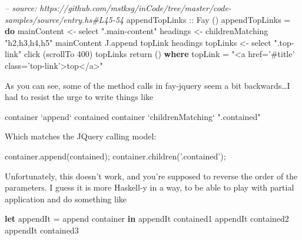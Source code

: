 \documentclass[]{article}
\newenvironment{Shaded}{}{}
\newcommand{\KeywordTok}[1]{\textcolor[rgb]{0.00,0.44,0.13}{\textbf{{#1}}}}
\newcommand{\DataTypeTok}[1]{\textcolor[rgb]{0.56,0.13,0.00}{{#1}}}
\newcommand{\DecValTok}[1]{\textcolor[rgb]{0.25,0.63,0.44}{{#1}}}
\newcommand{\StringTok}[1]{\textcolor[rgb]{0.25,0.44,0.63}{{#1}}}
\newcommand{\CommentTok}[1]{\textcolor[rgb]{0.38,0.63,0.69}{\textit{{#1}}}}
\newcommand{\OtherTok}[1]{\textcolor[rgb]{0.00,0.44,0.13}{{#1}}}
\newcommand{\FunctionTok}[1]{\textcolor[rgb]{0.02,0.16,0.49}{{#1}}}
\newcommand{\VariableTok}[1]{\textcolor[rgb]{0.10,0.09,0.49}{{#1}}}
\newcommand{\OperatorTok}[1]{\textcolor[rgb]{0.40,0.40,0.40}{{#1}}}
\newcommand{\AttributeTok}[1]{\textcolor[rgb]{0.49,0.56,0.16}{{#1}}}
\newcommand{\NormalTok}[1]{{#1}}
\begin{document}
\begin{Shaded}
\begin{Highlighting}[]
\CommentTok{-- source: https://github.com/mstksg/inCode/tree/master/code-samples/source/entry.hs#L45-54}
\OtherTok{appendTopLinks ::} \DataTypeTok{Fay} \NormalTok{()}
\NormalTok{appendTopLinks }\FunctionTok{=} \KeywordTok{do}
  \NormalTok{mainContent }\OtherTok{<-} \NormalTok{select }\StringTok{".main-content"}
  \NormalTok{headings }\OtherTok{<-} \NormalTok{childrenMatching }\StringTok{"h2,h3,h4,h5"} \NormalTok{mainContent}
  \NormalTok{J.append topLink headings}
  \NormalTok{topLinks }\OtherTok{<-} \NormalTok{select }\StringTok{".top-link"}
  \NormalTok{click (scrollTo }\DecValTok{400}\NormalTok{) topLinks}
  \NormalTok{return ()}
  \KeywordTok{where}
    \NormalTok{topLink }\FunctionTok{=} \StringTok{"<a href='#title' class='top-link'>top</a>"}
\end{Highlighting}
\end{Shaded}

As you can see, some of the method calls in fay-jquery seem a bit
backwards\ldots{}I had to resist the urge to write things like

\begin{Shaded}
\begin{Highlighting}[]
\NormalTok{container }\OtherTok{`append`} \NormalTok{contained}
\NormalTok{container }\OtherTok{`childrenMatching`} \StringTok{".contained"}
\end{Highlighting}
\end{Shaded}

Which matches the JQuery calling model:

\begin{Shaded}
\begin{Highlighting}[]
\VariableTok{container}\NormalTok{.}\AttributeTok{append}\NormalTok{(contained)}\OperatorTok{;}
\VariableTok{container}\NormalTok{.}\AttributeTok{children}\NormalTok{(}\StringTok{'.contained'}\NormalTok{)}\OperatorTok{;}
\end{Highlighting}
\end{Shaded}

Unfortunately, this doesn't work, and you're supposed to reverse the order of
the parameters. I guess it is more Haskell-y in a way, to be able to play with
partial application and do something like

\begin{Shaded}
\begin{Highlighting}[]
\KeywordTok{let}
  \NormalTok{appendIt }\FunctionTok{=} \NormalTok{append container}
\KeywordTok{in}
  \NormalTok{appendIt contained1}
  \NormalTok{appendIt contained2}
  \NormalTok{appendIt contained3}
\end{Highlighting}
\end{Shaded}
\end{document}
